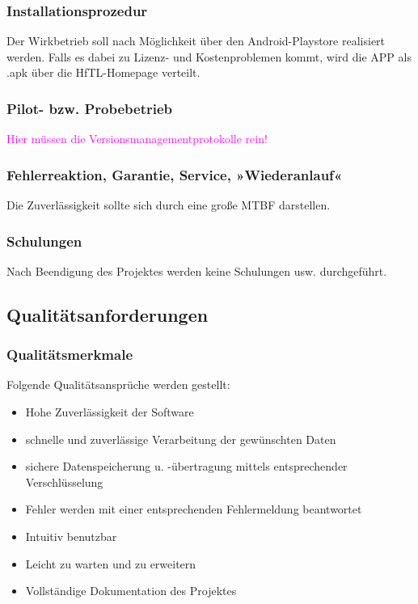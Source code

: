 \subsubsection{Installationsprozedur}

Der Wirkbetrieb soll nach Möglichkeit über den Android-Playstore realisiert werden. Falls es dabei zu Lizenz- und Kostenproblemen kommt, wird die APP als \ac{.apk} über die HfTL-Homepage verteilt.



\subsubsection{Pilot- bzw. Probebetrieb}
\textcolor{magenta}{Hier müssen die Versionsmanagementprotokolle rein!}




\subsubsection{Fehlerreaktion, Garantie, Service, »Wiederanlauf«}
Die Zuverlässigkeit sollte sich durch eine große \ac{MTBF} darstellen.



\subsubsection{Schulungen}
Nach Beendigung des Projektes werden keine Schulungen usw. durchgeführt.


\subsection{\textbf{Qualitätsanforderungen}}

\subsubsection{Qualitätsmerkmale}
Folgende Qualitätsansprüche werden gestellt:
\begin{itemize}
	\item Hohe Zuverlässigkeit der Software
	\item schnelle und zuverlässige Verarbeitung der gewünschten Daten
	\item sichere Datenspeicherung u. -übertragung mittels entsprechender Verschlüsselung
	\item Fehler werden mit einer entsprechenden Fehlermeldung beantwortet
	\item Intuitiv benutzbar
	\item Leicht zu warten und zu erweitern
	\item Vollständige Dokumentation des Projektes
\end{itemize}




